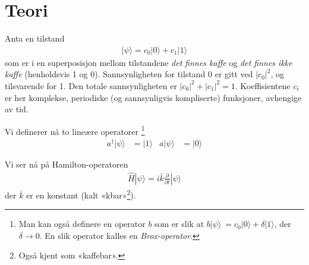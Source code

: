 \documentclass[12pt]{article}
\title{}
\newcommand{\ra}{\rangle}
\newcommand{\op}[1]{\hat{#1}}
\newcommand{\da}{\dagger}
\begin{document}
\section{Teori}
\label{sec:teori}
Anta en tilstand
\begin{align*}
	|\psi \ra = c_0 |0\ra + c_1 |1\ra
\end{align*}
som er i en superposisjon mellom tilstandene \textit{det finnes kaffe} 
og \textit{det finnes ikke kaffe} (henholdsvis 1 og 0).
Sannsynligheten for tilstand 0 er gitt ved $|c_0|^2$, og tilsvarende for 1.
Den totale sannsynligheten er $|c_0|^2 + |c_1|^2 = 1$.
Koeffisientene $c_i$ er her komplekse, 
periodiske  (og sannsynligvis kompliserte) funksjoner,
avhengige av tid.

Vi definerer nå to lineære operatorer
\footnote{Man kan også definere en operator $b$ som er slik at 
$b|\psi\ra \ = c_0|0\ra + \delta|1\ra $, der $\delta\rightarrow 0$. 
En slik operator kalles en \textit{Brox-operator}.}
\begin{align*}
	a^\da |\psi\ra
	&= |1\ra&
	a |\psi\ra
	&= |0\ra
\end{align*}

Vi ser nå på Hamilton-operatoren
\begin{align}
    \op H |\psi\ra = i\bar{k} \frac{\partial}{\partial t} |\psi\ra
\end{align}
der $\bar{k}$ er en konstant (kalt «kbar»\footnote{Også kjent som «kaffebar».}).
\end{document}
